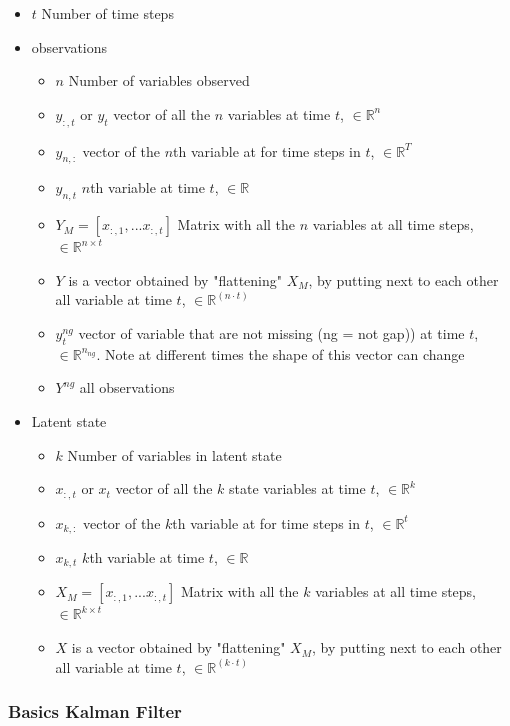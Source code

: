 \documentclass{article}
\let\Oldsubsubsection\subsubsection
\renewcommand{\subsubsection}{\FloatBarrier\Oldsubsubsection}
\begin{document}
\begin{itemize}
\item $t$  Number of time steps
\item observations
\begin{itemize}
    \item $n$  Number of variables observed
    \item $y_{:,t}$ or $y_t$ vector of all the $n$ variables at time $t$, $\in \mathbb{R}^n $
    \item $y_{n,:}$ vector of the $n$th variable at for time steps in $t$, $\in \mathbb{R}^T$
    \item $y_{n,t}$ $n$th variable at time $t$, $\in \mathbb{R}$ 
    \item $Y_M = [x_{:,1}, ... x_{:, t}]$ Matrix with all the $n$ variables at all time steps, $\in \mathbb{R}^{n \times t}$ 
    \item $Y$ is a vector obtained by "flattening" $X_M$, by putting next to each other all variable at time $t$, $\in \mathbb{R}^{(n \cdot t)}$
    \item $y^{ng}_t$ vector of variable that are not missing (ng = not gap)) at time $t$, $\in \mathbb{R}^{n_{ng}}$. Note at different times the shape of this vector can change
    \item $Y^{ng}$ all observations
\end{itemize}

\item Latent state
\begin{itemize}
    \item $k$  Number of variables in latent state
    \item $x_{:,t}$ or $x_t$ vector of all the $k$ state variables at time $t$, $\in \mathbb{R}^k $
    \item $x_{k,:}$ vector of the $k$th variable at for time steps in $t$, $\in \mathbb{R}^t$
    \item $x_{k,t}$ $k$th variable at time $t$, $\in \mathbb{R}$ 
    \item $X_M = [x_{:,1}, ... x_{:, t}]$ Matrix with all the $k$ variables at all time steps, $\in \mathbb{R}^{k \times t}$ 
    \item $X$ is a vector obtained by "flattening" $X_M$, by putting next to each other all variable at time $t$, $\in \mathbb{R}^{(k \cdot t)}$
\end{itemize}

\end{itemize}


\subsubsection{Basics Kalman Filter}
\end{document}
